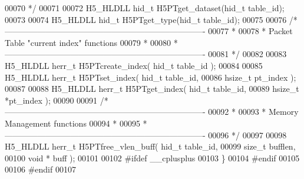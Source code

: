\begin{DoxyCode}
00070 \textcolor{comment}{ */}
00071 
00072 H5\_HLDLL hid\_t H5PTget\_dataset(hid\_t table\_id);
00073 
00074 H5\_HLDLL hid\_t H5PTget\_type(hid\_t table\_id);
00075 
00076 \textcolor{comment}{/*-------------------------------------------------------------------------}
00077 \textcolor{comment}{ *}
00078 \textcolor{comment}{ * Packet Table "current index" functions}
00079 \textcolor{comment}{ *}
00080 \textcolor{comment}{ *-------------------------------------------------------------------------}
00081 \textcolor{comment}{ */}
00082 
00083 H5\_HLDLL herr\_t  H5PTcreate\_index( hid\_t table\_id );
00084 
00085 H5\_HLDLL herr\_t  H5PTset\_index( hid\_t table\_id,
00086                              hsize\_t pt\_index );
00087 
00088 H5\_HLDLL herr\_t  H5PTget\_index( hid\_t table\_id,
00089                              hsize\_t *pt\_index );
00090 
00091 \textcolor{comment}{/*-------------------------------------------------------------------------}
00092 \textcolor{comment}{ *}
00093 \textcolor{comment}{ * Memory Management functions}
00094 \textcolor{comment}{ *}
00095 \textcolor{comment}{ *-------------------------------------------------------------------------}
00096 \textcolor{comment}{ */}
00097 
00098 H5\_HLDLL herr\_t  H5PTfree\_vlen\_buff( hid\_t table\_id,
00099                                \textcolor{keywordtype}{size\_t} bufflen,
00100                                \textcolor{keywordtype}{void} * buff );
00101 
00102 \textcolor{preprocessor}{#ifdef \_\_cplusplus}
00103 \}
00104 \textcolor{preprocessor}{#endif}
00105 
00106 \textcolor{preprocessor}{#endif}
00107 
\end{DoxyCode}
